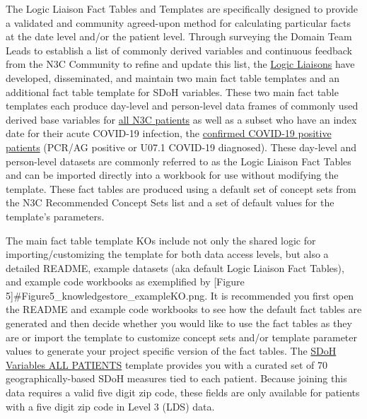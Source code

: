 \documentclass[
  letterpaper,
  DIV=11,
  numbers=noendperiod]{scrreprt}
\begin{document}
The Logic Liaison Fact Tables and Templates are specifically designed to
provide a validated and community agreed-upon method for calculating
particular facts at the date level and/or the patient level. Through
surveying the Domain Team Leads to establish a list of commonly derived
variables and continuous feedback from the N3C Community to refine and
update this list, the \href{https://covid.cd2h.org/liaisons}{Logic
Liaisons} have developed, disseminated, and maintain two main fact table
templates and an additional fact table template for SDoH variables.
These two main fact table templates each produce day-level and
person-level data frames of commonly used derived base variables for
\href{https://unite.nih.gov/workspace/module/view/latest/ri.workshop.main.module.3ab34203-d7f3-482e-adbd-f4113bfd1a2b?id=KO-BA3B835\&view=focus}{all
N3C patients} as well as a subset who have an index date for their acute
COVID-19 infection, the
\href{https://unite.nih.gov/workspace/module/view/latest/ri.workshop.main.module.3ab34203-d7f3-482e-adbd-f4113bfd1a2b?id=KO-BE5C652\&view=focus}{confirmed
COVID-19 positive patients} (PCR/AG positive or U07.1 COVID-19
diagnosed). These day-level and person-level datasets are commonly
referred to as the Logic Liaison Fact Tables and can be imported
directly into a workbook for use without modifying the template. These
fact tables are produced using a default set of concept sets from the
N3C Recommended Concept Sets list and a set of default values for the
template's parameters.

The main fact table template KOs include not only the shared logic for
importing/customizing the template for both data access levels, but also
a detailed README, example datasets (aka default Logic Liaison Fact
Tables), and example code workbooks as exemplified by {[}Figure
5{]}\#Figure5\_knowledgestore\_exampleKO.png. It is recommended you
first open the README and example code workbooks to see how the default
fact tables are generated and then decide whether you would like to use
the fact tables as they are or import the template to customize concept
sets and/or template parameter values to generate your project specific
version of the fact tables. The
\href{https://unite.nih.gov/workspace/module/view/latest/ri.workshop.main.module.3ab34203-d7f3-482e-adbd-f4113bfd1a2b?id=KO-1803D6D\&view=focus}{SDoH
Variables ALL PATIENTS} template provides you with a curated set of 70
geographically-based SDoH measures tied to each patient. Because joining
this data requires a valid five digit zip code, these fields are only
available for patients with a five digit zip code in Level 3 (LDS) data.
\end{document}
